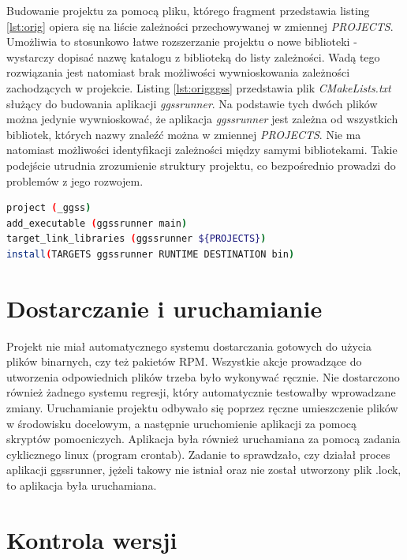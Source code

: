 Budowanie projektu za pomocą pliku, którego fragment przedstawia listing \ref{lst:orig} opiera się na liście zależności przechowywanej w zmiennej \textit{PROJECTS}. Umożliwia to stosunkowo łatwe rozszerzanie projektu o nowe biblioteki - wystarczy dopisać nazwę katalogu z biblioteką do listy zależności. Wadą tego rozwiązania jest natomiast brak możliwości wywnioskowania zależności zachodzących w projekcie. Listing \ref{lst:origggss} przedstawia plik \textit{CMakeLists.txt} służący do budowania aplikacji \textit{ggssrunner}. Na podstawie tych dwóch plików można jedynie wywnioskować, że aplikacja \textit{ggssrunner} jest zależna od wszystkich bibliotek, których nazwy znaleźć można w zmiennej \textit{PROJECTS}. Nie ma natomiast możliwości identyfikacji zależności między samymi bibliotekami. Takie podejście utrudnia zrozumienie struktury projektu, co bezpośrednio prowadzi do problemów z jego rozwojem.

\begin{lstlisting}[language=bash, caption={Oryginalny plik CMakeLists.txt służacy budowania aplikacji ggssrunner.}, label={lst:origggss}]
project (_ggss)
add_executable (ggssrunner main)
target_link_libraries (ggssrunner ${PROJECTS})
install(TARGETS ggssrunner RUNTIME DESTINATION bin)
\end{lstlisting}




\section{Dostarczanie i uruchamianie}

Projekt nie miał automatycznego systemu dostarczania gotowych do użycia plików binarnych, czy też pakietów RPM. Wszystkie akcje prowadzące do utworzenia odpowiednich plików trzeba było wykonywać ręcznie. Nie dostarczono również żadnego systemu regresji, który automatycznie testowałby wprowadzane zmiany. Uruchamianie projektu odbywało się poprzez ręczne umieszczenie plików w środowisku docelowym, a następnie uruchomienie aplikacji za pomocą skryptów pomocniczych. Aplikacja była również uruchamiana za pomocą zadania cyklicznego linux (program crontab). Zadanie to sprawdzało, czy działał proces aplikacji ggssrunner, jężeli takowy nie istniał oraz nie został utworzony plik .lock, to aplikacja była uruchamiana.

\section{Kontrola wersji}

